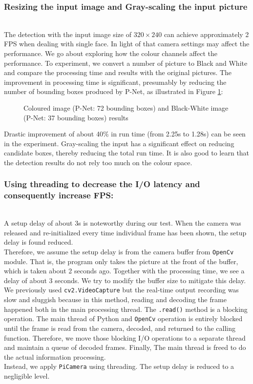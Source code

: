 \subsubsection{Resizing the input image and Gray-scaling the input picture}\\
The detection with the input image size of $320\times240$ can achieve approximately 2 FPS when dealing with single face. In light of that camera settings may affect the performance. We go about exploring how the colour channels affect the performance. To experiment, we convert a number of picture to Black and White and compare the processing time and results with the original pictures. The improvement in processing time is significant, presumably by reducing the number of bounding boxes produced by P-Net, as illustrated in Figure \ref{Figure.color}: \\[.2in]
\begin{figure}
    \centering
      \qquad
      \label{Figure.color}
      \caption{Coloured image (P-Net: 72 bounding boxes) and Black-White image (P-Net: 37 bounding boxes) results}
\end{figure}
Drastic improvement of about 40\% in run time (from 2.25s to 1.28s) can be seen in the experiment. Gray-scaling the input has a significant effect on reducing candidate boxes, thereby reducing the total run time. It is also good to learn that the detection results do not rely too much on the colour space.

\subsubsection{Using threading to decrease the I/O latency and consequently increase FPS:}\\
A setup delay of about 3s is noteworthy during our test. When the camera was released and re-initialized every time individual frame has been shown, the setup delay is found reduced.\\[.2in]
Therefore, we assume the setup delay is from the camera buffer from \verb#OpenCv# module. That is, the program only takes the picture at the front of the buffer, which is taken about 2 seconds ago. Together with the processing time, we see a delay of about 3 seconds. We try to modify the buffer size to mitigate this delay. \\[.2in]
We previously used \verb#cv2.VideoCapture# but the real-time output recording was slow and sluggish because in this method, reading and decoding the frame happened both in the main processing thread. The \verb#.read()# method is a blocking operation. The main thread of Python and \verb#OpenCv# operation is entirely blocked until the frame is read from the camera, decoded, and returned to the calling function. Therefore, we move those blocking I/O operations to a separate thread and maintain a queue of decoded frames. Finally, The main thread is freed to do the actual information processing.\\[.2in]
Instead, we apply \verb#PiCamera# using threading. The setup delay is reduced to a negligible level.


